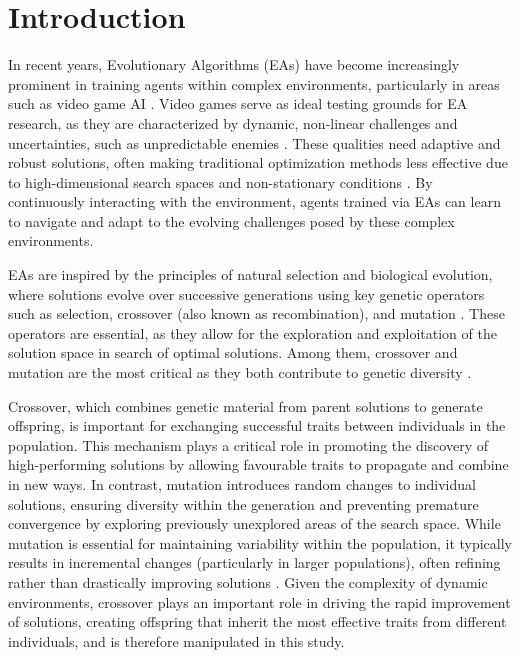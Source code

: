 
\section{Introduction}\label{sec:introduction}
In recent years, Evolutionary Algorithms (EAs) have become increasingly prominent in training agents within complex environments, particularly in areas such as video game AI \cite{lucas2006evolutionary}.
Video games serve as ideal testing grounds for EA research, as they are characterized by dynamic, non-linear challenges and uncertainties, such as unpredictable enemies \cite{togelius2007computational, togelius2009super}.
These qualities need adaptive and robust solutions, often making traditional optimization methods less effective due to high-dimensional search spaces and non-stationary conditions \cite{yannakakis2018AIgames}.
By continuously interacting with the environment, agents trained via EAs can learn to navigate and adapt to the evolving challenges posed by these complex environments.

EAs are inspired by the principles of natural selection and biological evolution, where solutions evolve over successive generations using key genetic operators such as selection, crossover (also known as recombination), and mutation \cite{eiben2015bookEA}.
These operators are essential, as they allow for the exploration and exploitation of the solution space in search of optimal solutions.
Among them, crossover and mutation are the most critical as they both contribute to genetic diversity \cite{luke1997comparison}.

Crossover, which combines genetic material from parent solutions to generate offspring, is important for exchanging successful traits between individuals in the population.
This mechanism plays a critical role in promoting the discovery of high-performing solutions by allowing favourable traits to propagate and combine in new ways.
In contrast, mutation introduces random changes to individual solutions, ensuring diversity within the generation and preventing premature convergence by exploring previously unexplored areas of the search space.
While mutation is essential for maintaining variability within the population, it typically results in incremental changes (particularly in larger populations), often refining rather than drastically improving solutions \cite{luke1997comparison}.
Given the complexity of dynamic environments, crossover plays an important role in driving the rapid improvement of solutions, creating offspring that inherit the most effective traits from different individuals, and is therefore manipulated in this study.

